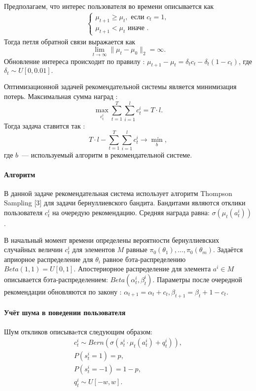 \documentclass[12pt, twoside]{article}
\begin{document}
Предполагаем, что интерес пользователя во времени описывается как 
\begin{gather*}
  \begin{cases}
    \mu_{t+1} \geq \mu_{t}, \text{ если } c_t = 1,  \\
    \mu_{t+1} < \mu_{t} \text{ иначе }. 
  \end{cases}
\end{gather*}
Тогда петля обратной связи выражается как \[ \lim_{t \to \infty} \|\mu_t - \mu_0 \|_2 = \infty. \]
Обновление интереса происходит по правилу : 
$\mu_{t+1} - \mu_{t} = \delta_t c_t - \delta_t (1 - c_t)$, 
где $\delta_t \sim U[0, 0.01].$

Оптимизационной задачей рекомендательной системы является минимизация потерь. 
Максимальная сумма наград : \[ \max_{c_t^i} \sum_{t = 1}^T \sum_{i = 1}^l c_t^i = T \cdot l.\] 
Тогда задача ставится так : 
\[
  T \cdot l - \sum_{t = 1}^T \sum_{i = 1}^l c_t^i \to \min_{b}, 
\]
где $b$~--- используемый алгоритм в рекомендательной системе. 

\paragraph{Алгоритм}
В данной задаче рекомендательная система использует алгоритм Thompson Sampling [3] для задачи бернуллиевского бандита.  
Бандитами являются отклики пользователя $c_t^i$ на очередую рекомендацию.
Средняя награда равна: $\sigma(\mu_t(a_t^i))$.

В начальный момент времени определены вероятности бернуллиевских случайных величин $c_t^i$ для элементов $M$ равные $\pi_0(\theta_1), \dots, \pi_0(\theta_m)$. 
Задаётся априорное распределение для $\theta_i$ равное бэта-распределению $Beta(1, 1) = U[0, 1]$. 
Апостериорное распределение для элемента $a^i \in M$ описывается бэта-распределением: $Beta(\alpha_t^i, \beta_t^i)$. 
Параметры после очередной рекомендации обновляются по закону :
$\alpha_{t+1} = \alpha_t + c_t, \beta_{t+1} = \beta_t + 1 - c_t$.

\paragraph{Учёт шума в поведении пользователя}
Шум откликов описываeтся следующим образом: 
\begin{gather*}
  c_t^i \sim Bern \left(\sigma(s_t^i \cdot \mu_t(a_t^i) + q_t^i) \right), \\
  P(s_t^i = 1) = p, \\ P(s_t^i = -1) = 1 - p, \\
  q_t^i \sim U[-w, w].
\end{gather*}
\end{document}
